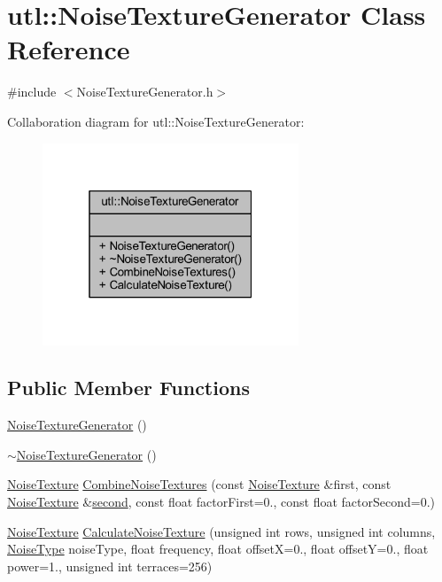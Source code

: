 \hypertarget{classutl_1_1_noise_texture_generator}{}\section{utl\+:\+:Noise\+Texture\+Generator Class Reference}
\label{classutl_1_1_noise_texture_generator}


{\ttfamily \#include $<$Noise\+Texture\+Generator.\+h$>$}



Collaboration diagram for utl\+:\+:Noise\+Texture\+Generator\+:
\nopagebreak
\begin{figure}[H]
\begin{center}
\leavevmode
\includegraphics[width=217pt]{classutl_1_1_noise_texture_generator__coll__graph}
\end{center}
\end{figure}
\subsection*{Public Member Functions}
\begin{DoxyCompactItemize}
\item 
\mbox{\hyperlink{classutl_1_1_noise_texture_generator_a9228841d5b3e0c1a92765a757808af9e}{Noise\+Texture\+Generator}} ()
\item 
\mbox{\hyperlink{classutl_1_1_noise_texture_generator_a470a7c169cbe58d4c68cfe00a71fd8b3}{$\sim$\+Noise\+Texture\+Generator}} ()
\item 
\mbox{\hyperlink{classutl_1_1_noise_texture}{Noise\+Texture}} \mbox{\hyperlink{classutl_1_1_noise_texture_generator_a176b962612f04c33976fd08020f81032}{Combine\+Noise\+Textures}} (const \mbox{\hyperlink{classutl_1_1_noise_texture}{Noise\+Texture}} \&first, const \mbox{\hyperlink{classutl_1_1_noise_texture}{Noise\+Texture}} \&\mbox{\hyperlink{namespaceutl_ad221bb3fac593651670bdc0263b92707aa9f0e61a137d86aa9db53465e0801612}{second}}, const float factor\+First=0., const float factor\+Second=0.)
\item 
\mbox{\hyperlink{classutl_1_1_noise_texture}{Noise\+Texture}} \mbox{\hyperlink{classutl_1_1_noise_texture_generator_a588a7656227cb9dd99e8c56de5de686d}{Calculate\+Noise\+Texture}} (unsigned int rows, unsigned int columns, \mbox{\hyperlink{namespaceutl_a42b249122648f147a9f518c8661cc8d2}{Noise\+Type}} noise\+Type, float frequency, float offsetX=0., float offsetY=0., float power=1., unsigned int terraces=256)
\end{DoxyCompactItemize}


